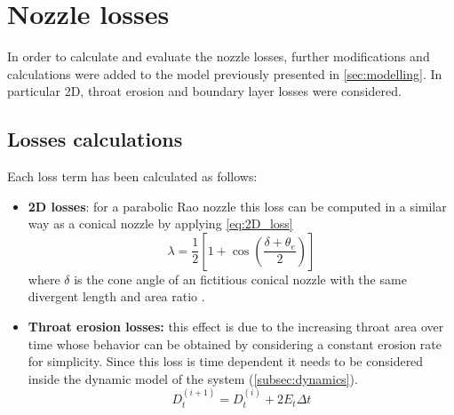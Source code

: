 \section{Nozzle losses}
\label{sec:nozzle_losses}

In order to calculate and evaluate the nozzle losses, further modifications and calculations were added to the model previously presented in \autoref{sec:modelling}.
In particular 2D, throat erosion and boundary layer losses were considered.

\subsection{Losses calculations}  

Each loss term has been calculated as follows:
\begin{itemize}
    \item \textbf{2D losses}: for a parabolic Rao nozzle this loss can be computed in a similar way as a conical nozzle by applying \autoref{eq:2D_loss}
    \begin{equation}
        \lambda = \frac{1}{2} \left[ 1 + \cos \left( \frac{\delta + \theta_e}{2}\right)\right]
        \label{eq:2D_loss}
    \end{equation}
    where $\delta$ is the cone angle of an fictitious conical nozzle with the same divergent length and area ratio \cite{sutton}.
    \item \textbf{Throat erosion losses:} this effect is due to the increasing throat area over time whose behavior can be obtained by considering a constant erosion rate for simplicity. Since this loss is time dependent it needs to be considered inside the dynamic model of the system (\autoref{subsec:dynamics}).
    \begin{equation}
        D_t^{(i+1)} = D_t^{(i)} + 2 E_t \Delta t
    \end{equation}


\end{itemize}
